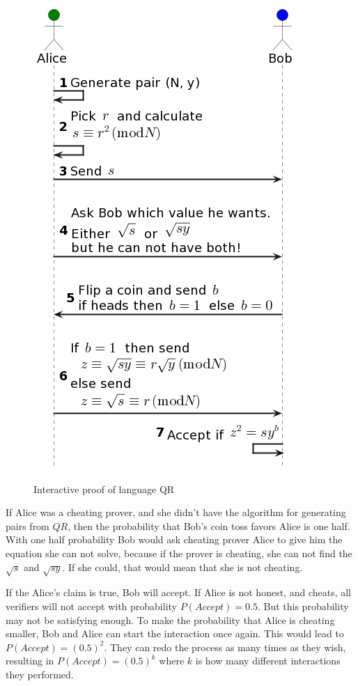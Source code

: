 \documentclass[conference,comsoc,10pt]{IEEEtran}
\begin{document}
        \begin{figure}[h!]
            \centering
            \includegraphics[scale=0.5]{../bachelor/assets/images/qr_ip.png}
            \caption{Interactive proof of language QR}
            \cite{Goldwasser1989, youtubeMOOCLecture1}
            \label{fig:qr_ip}
            \vspace{0.5cm}
        \end{figure}


        If Alice was a cheating prover, and she didn't have the algorithm for
        generating pairs from $QR$, then the probability that Bob's coin toss favors
        Alice is one half. With one half probability Bob would ask cheating prover
        Alice to give him the equation she can not solve, because if the prover is
        cheating, she can not find the $\sqrt{s}$ and $\sqrt{sy}$. If she could,
        that would mean that she is not cheating.

        If the Alice's claim is true, Bob will accept. If Alice is not honest, and
        cheats, all verifiers will not accept with probability $P(Accept) = 0.5$.
        But this probability may not be satisfying enough. To make the probability
        that Alice is cheating smaller, Bob and Alice can start the interaction once
        again. This would lead to $P(Accept) = (0.5)^2$. They can redo the process
        as many times as they wish, resulting in $P(Accept) = (0.5)^k$ where $k$
        is how many different interactions they performed.
\end{document}
